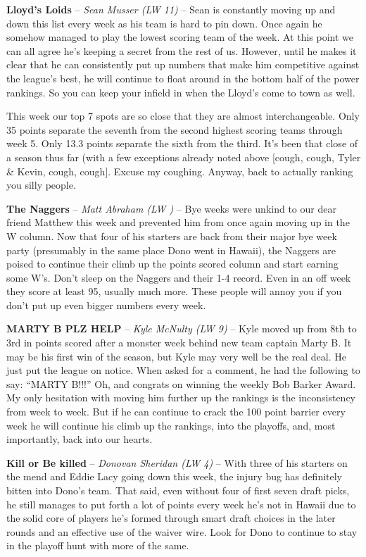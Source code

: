 \documentclass[11pt,letterpaper]{article}
\begin{document}
\begin{etaremune}
\item \textbf{Lloyd's Loids} -- \textit{Sean Musser (LW 11)} -- Sean is constantly moving up and down this list every week as his team is hard to pin down. Once again he somehow managed to play the lowest scoring team of the week. At this point we can all agree he's keeping a secret from the rest of us. However, until he makes it clear that he can consistently put up numbers that make him competitive against the league's best, he will continue to float around in the bottom half of the power rankings. So you can keep your infield in when the Lloyd's come to town as well. 

\newpage
\par\noindent This week our top 7 spots are so close that they are almost interchangeable. Only 35 points separate the seventh from the second highest scoring teams through week 5. Only 13.3 points separate the sixth from the third. It's been that close of a season thus far (with a few exceptions already noted above [cough, cough, Tyler \& Kevin, cough, cough]. Excuse my coughing. Anyway, back to actually ranking you silly people. 
\item \textbf{The Naggers} -- \textit{Matt Abraham (LW )} -- Bye weeks were unkind to our dear friend Matthew this week and prevented him from once again moving up in the W column. Now that four of his starters are back from their major bye week party (presumably in the same place Dono went in Hawaii), the Naggers are poised to continue their climb up the points scored column and start earning some W's. Don't sleep on the Naggers and their 1-4 record. Even in an off week they score at least 95, usually much more. These people will annoy you if you don't put up even bigger numbers every week. 
\item \textbf{MARTY B PLZ HELP} -- \textit{Kyle McNulty (LW 9)} -- Kyle moved up from 8th to 3rd in points scored after a monster week behind new team captain Marty B. It may be his first win of the season, but Kyle may very well be the real deal. He just put the league on notice. When asked for a comment, he had the following to say: ``MARTY B!!!'' Oh, and congrats on winning the weekly Bob Barker Award. My only hesitation with moving him further up the rankings is the inconsistency from week to week. But if he can continue to crack the 100 point barrier every week he will continue his climb up the rankings, into the playoffs, and, most importantly, back into our hearts.   
\item \textbf{Kill or Be killed} -- \textit{Donovan Sheridan (LW 4)} -- With three of his starters on the mend and Eddie Lacy going down this week, the injury bug has definitely bitten into Dono's team. That said, even without four of first seven draft picks, he still manages to put forth a lot of points every week he's not in Hawaii due to the solid core of players he's formed through smart draft choices in the later rounds and an effective use of the waiver wire. Look for Dono to continue to stay in the playoff hunt with more of the same. 

\end{etaremune}
\end{document}
